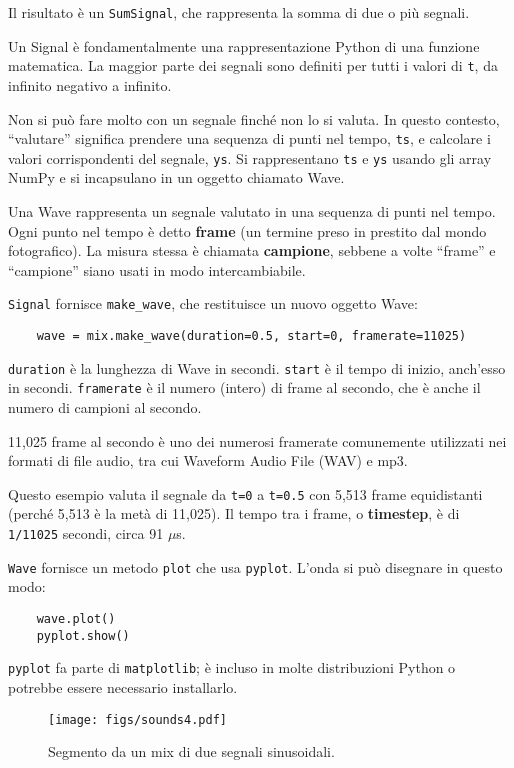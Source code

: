 \documentclass[12pt,a4paper]{book}
\begin{document}
Il risultato è un {\tt SumSignal}, che rappresenta la somma di due o più segnali.

Un Signal è fondamentalmente una rappresentazione Python di una funzione matematica. La maggior parte dei segnali sono definiti per tutti i valori di {\tt t}, da infinito negativo a infinito.

Non si può fare molto con un segnale finché non lo si valuta. In questo contesto, ``valutare'' significa prendere una sequenza di punti nel tempo, {\tt ts}, e calcolare i valori corrispondenti del segnale, {\tt ys}. Si rappresentano {\tt ts} e {\tt ys} usando gli array NumPy e si incapsulano in un oggetto chiamato Wave.

Una Wave rappresenta un segnale valutato in una sequenza di punti nel tempo. Ogni punto nel tempo è detto {\bf frame} (un termine preso in prestito dal mondo fotografico). La misura stessa è chiamata {\bf campione}, sebbene a volte ``frame'' e ``campione'' siano usati in modo intercambiabile.

{\tt Signal} fornisce \verb"make_wave", che restituisce un nuovo oggetto Wave:

\begin{verbatim} 
    wave = mix.make_wave(duration=0.5, start=0, framerate=11025)
 \end{verbatim} 

{\tt duration} è la lunghezza di Wave in secondi. {\tt start} è il tempo di inizio, anch'esso in secondi. {\tt framerate} è il numero (intero) di frame al secondo, che è anche il numero di campioni al secondo.

11,025 frame al secondo è uno dei numerosi framerate comunemente utilizzati nei formati di file audio, tra cui Waveform Audio File (WAV) e mp3.

Questo esempio valuta il segnale da {\tt t=0} a {\tt t=0.5} con 5,513 frame equidistanti (perché 5,513 è la metà di 11,025). Il tempo tra i frame, o {\bf timestep}, è di {\tt 1/11025} secondi, circa 91 $\mu$s.

{\tt Wave} fornisce un metodo {\tt plot} che usa {\tt pyplot}. L'onda si può disegnare in questo modo:

\begin{verbatim} 
    wave.plot()
    pyplot.show()
 \end{verbatim} 

{\tt pyplot} fa parte di {\tt matplotlib}; è incluso in molte distribuzioni Python o potrebbe essere necessario installarlo.

\begin{figure} 

\centerline{\texttt{[image: figs/sounds4.pdf]}} \caption{Segmento da un mix di due segnali sinusoidali.} \label{fig.sounds4} \end{figure} 
\end{document}
